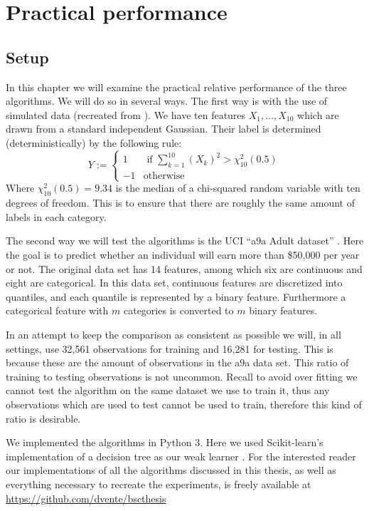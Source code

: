 


\chapter{Practical performance}
\label{chap:pracPerf}
\section{Setup}
\label{sec:Setup}
In this chapter we will examine the practical relative performance of the three algorithms. We will do so in several ways. The first way is with the use of simulated data (recreated from \cite{Hastie2009}). We have ten features $X_1,\ldots,X_{10}$ which are drawn from a standard independent Gaussian. Their label is determined (deterministically) by the following rule: $$Y:=\begin{cases}
1 & \text{ if } \sum_{k=1}^{10} (X_k)^2 > \chi_{10}^2(0.5)\\
-1 & \text{otherwise}
\end{cases}$$ Where $\chi_{10}^2(0.5)=9.34$ is the median of a chi-squared random variable with ten degrees of freedom. This is to ensure that there are roughly the same amount of labels in each category. 

\par The second way we will test the algorithms is the UCI ``a9a Adult dataset'' \cite{LIBSVM}. Here the goal is to predict whether an individual will earn more than \$50,000 per year or not. The original data set has 14 features, among which six are continuous and eight are categorical. In this data set, continuous features are discretized into quantiles, and each quantile is represented by a binary feature. Furthermore a categorical feature with $m$ categories is converted to $m$ binary features. 

\par In an attempt to keep the comparison as consistent as possible we will, in all settings, use 32,561 observations for training and 16,281 for testing. This is because these are the amount of observations in the a9a data set. This ratio of training to testing observations is not uncommon. Recall to avoid over fitting we cannot test the algorithm on the same dataset we use to train it, thus any observations which are used to test cannot be used to train, therefore this kind of ratio is desirable.

\par We implemented the algorithms in Python 3. Here we used Scikit-learn's implementation of a decision tree as our weak learner \cite{Pedregosa2012}. For the interested reader our implementations of all the algorithms discussed in this thesis, as well as everything necessary to recreate the experiments, is freely available at \url{https://github.com/dvente/bscthesis} 

